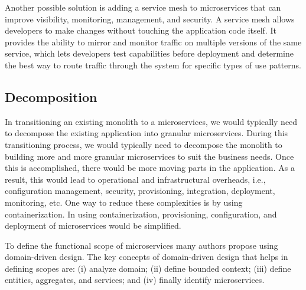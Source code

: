 Another possible solution is adding a service mesh to microservices that can improve visibility, monitoring, management, and security.\cite{Zaytev2018, Ndungu2019} A service mesh allows developers to make changes without touching the application code itself. It provides the ability to mirror and monitor traffic on multiple versions of the same service, which lets developers test capabilities before deployment and determine the best way to route traffic through the system for specific types of use patterns.\cite{gozneli2020,Premchand2018}



\subsection{Decomposition}%

In transitioning an existing monolith to a microservices, we would typically need to decompose the existing application into granular microservices.\cite{Taibi2019} During this transitioning process, we would typically need to decompose the monolith to building more and more granular microservices to suit the business needs. Once this is accomplished, there would be more moving parts in the application.\cite{Carvalho2019} As a result, this would lead to operational and infrastructural overheads, i.e., configuration management, security, provisioning, integration, deployment, monitoring, etc. One way to reduce these complexities is by using containerization. In using containerization, provisioning, configuration, and deployment of microservices would be simplified.\cite{Zhang2019}

To define the functional scope of microservices many authors propose using domain-driven design.\cite{Merson2020, neves2019, Zrzavy2020}
The key concepts of domain-driven design that helps in defining scopes are:
(i) analyze domain;
(ii) define bounded context;
(iii) define entities, aggregates, and services;
and (iv) finally identify microservices. 


